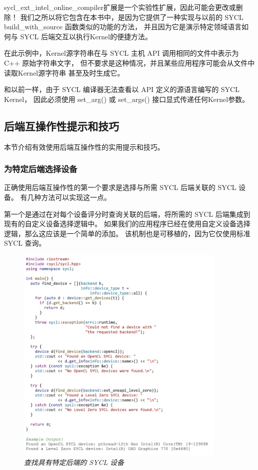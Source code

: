 \begin{remark}[注意，实验性扩展！]
sycl\_ext\_intel\_online\_compiler扩展是一个实验性扩展，因此可能会更改或删除！
我们之所以将它包含在本书中，是因为它提供了一种实现与以前的 SYCL build\_with\_source 函数类似的功能的方法，
并且因为它是演示特定领域语言如何与 SYCL 后端交互以执行Kernel的便捷方法。
\end{remark}

在此示例中，Kernel源字符串在与 SYCL 主机 API 调用相同的文件中表示为 C++ 原始字符串文字，
但不要求是这种情况，并且某些应用程序可能会从文件中读取Kernel源字符串 甚至及时生成它。

和以前一样，由于 SYCL 编译器无法查看以 API 定义的源语言编写的 SYCL Kernel，
因此必须使用 set\_arg() 或 set\_args() 接口显式传递任何Kernel参数。

\subsection{后端互操作性提示和技巧}
本节介绍有效使用后端互操作性的实用提示和技巧。

\subsubsection{为特定后端选择设备}
正确使用后端互操作性的第一个要求是选择与所需 SYCL 后端关联的 SYCL 设备。 
有几种方法可以实现这一点。

第一个是通过在对每个设备评分时查询关联的后端，将所需的 SYCL 后端集成到现有的自定义设备选择逻辑中。 
如果我们的应用程序已经在使用自定义设备选择逻辑，那么这应该是一个简单的添加。 
该机制也是可移植的，因为它仅使用标准 SYCL 查询。

\begin{figure}[H]
	\centering
	\includegraphics[width=0.9\textwidth]{figs/F20.11.png}
	\caption{\textit{查找具有特定后端的 SYCL 设备 }}
\end{figure}

